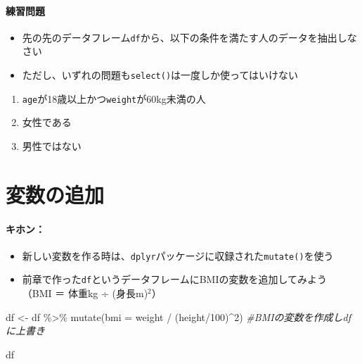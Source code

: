 \documentclass[
]{book}
\newenvironment{Shaded}{\begin{snugshade}}{\end{snugshade}}
\newcommand{\AttributeTok}[1]{\textcolor[rgb]{0.77,0.63,0.00}{#1}}
\newcommand{\CommentTok}[1]{\textcolor[rgb]{0.56,0.35,0.01}{\textit{#1}}}
\newcommand{\DecValTok}[1]{\textcolor[rgb]{0.00,0.00,0.81}{#1}}
\newcommand{\FunctionTok}[1]{\textcolor[rgb]{0.00,0.00,0.00}{#1}}
\newcommand{\NormalTok}[1]{#1}
\newcommand{\OtherTok}[1]{\textcolor[rgb]{0.56,0.35,0.01}{#1}}
\newcommand{\SpecialCharTok}[1]{\textcolor[rgb]{0.00,0.00,0.00}{#1}}
\providecommand{\tightlist}{%
  \setlength{\itemsep}{0pt}\setlength{\parskip}{0pt}}
\begin{document}
\hypertarget{ux7df4ux7fd2ux554fux984c-6}{%
\paragraph*{練習問題}\label{ux7df4ux7fd2ux554fux984c-6}}

\begin{itemize}
\tightlist
\item
  先の先のデータフレーム\texttt{df}から、以下の条件を満たす人のデータを抽出しなさい
\item
  ただし、いずれの問題も\texttt{select()}は一度しか使ってはいけない
\end{itemize}

\begin{enumerate}
\def\labelenumi{\arabic{enumi}.}
\tightlist
\item
  \texttt{age}が18歳以上かつ\texttt{weight}が60kg未満の人
\item
  女性である
\item
  男性ではない
\end{enumerate}

\hypertarget{ux5909ux6570ux306eux8ffdux52a0}{%
\section{変数の追加}\label{ux5909ux6570ux306eux8ffdux52a0}}

\hypertarget{ux30adux30dbux30f3}{%
\paragraph*{キホン：}\label{ux30adux30dbux30f3}}

\begin{itemize}
\tightlist
\item
  新しい変数を作る時は、\texttt{dplyr}パッケージに収録された\texttt{mutate()}を使う
\item
  前章で作った\texttt{df}というデータフレームにBMIの変数を追加してみよう\\
  （BMI ＝ 体重kg ÷ (身長m)\(^2\)）
\end{itemize}

\begin{Shaded}
\begin{Highlighting}[]
\NormalTok{df }\OtherTok{\textless{}{-}}\NormalTok{ df }\SpecialCharTok{\%\textgreater{}\%} 
  \FunctionTok{mutate}\NormalTok{(}\AttributeTok{bmi =}\NormalTok{ weight }\SpecialCharTok{/}\NormalTok{ (height}\SpecialCharTok{/}\DecValTok{100}\NormalTok{)}\SpecialCharTok{\^{}}\DecValTok{2}\NormalTok{) }\CommentTok{\#BMIの変数を作成しdfに上書き}

\NormalTok{df}
\end{Highlighting}
\end{Shaded}
\end{document}
